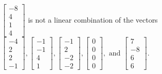 \begin{exercise}
\begin{exerciseStatement}
  \end{exerciseStatement}
  \begin{exerciseAnswer}
   \(\left[\begin{array}{c}
-8 \\
4 \\
1 \\
4
\end{array}\right]\) 
  	 is not  
	a linear combination of the vectors \(\left[\begin{array}{c}
-4 \\
2 \\
2 \\
-1
\end{array}\right] , \left[\begin{array}{c}
-1 \\
-1 \\
4 \\
1
\end{array}\right] , \left[\begin{array}{c}
-1 \\
2 \\
-2 \\
-2
\end{array}\right] , \left[\begin{array}{c}
0 \\
0 \\
0 \\
0
\end{array}\right] , \text{ and } \left[\begin{array}{c}
7 \\
-8 \\
6 \\
6
\end{array}\right]\).

	
  


  \end{exerciseAnswer}
\end{exercise}